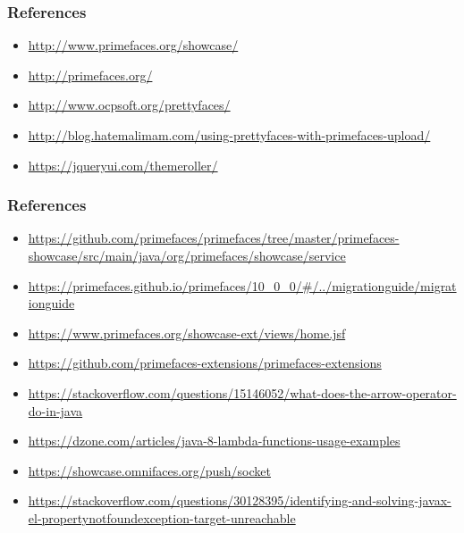 \documentclass[10pt,xcolor=pdflatex]{beamer}
\begin{document}
\begin{frame}\frametitle{References}
  \begin{itemize}
    \item \url{http://www.primefaces.org/showcase/}
	\item \url{http://primefaces.org/}
    \item \url{http://www.ocpsoft.org/prettyfaces/}
    \item \url{http://blog.hatemalimam.com/using-prettyfaces-with-primefaces-upload/}
    \item \url{https://jqueryui.com/themeroller/}
  \end{itemize}
\end{frame}

\begin{frame}\frametitle{References}
  \begin{itemize}
    \item \url{https://github.com/primefaces/primefaces/tree/master/primefaces-showcase/src/main/java/org/primefaces/showcase/service}
    \item \url{https://primefaces.github.io/primefaces/10_0_0/\#/../migrationguide/migrationguide}
    \item \url{https://www.primefaces.org/showcase-ext/views/home.jsf}
    \item \url{https://github.com/primefaces-extensions/primefaces-extensions}
    \item \url{https://stackoverflow.com/questions/15146052/what-does-the-arrow-operator-do-in-java}
    \item \url{https://dzone.com/articles/java-8-lambda-functions-usage-examples}
    \item \url{https://showcase.omnifaces.org/push/socket}
    \item \url{https://stackoverflow.com/questions/30128395/identifying-and-solving-javax-el-propertynotfoundexception-target-unreachable}
  \end{itemize}
\end{frame}

\end{document}
